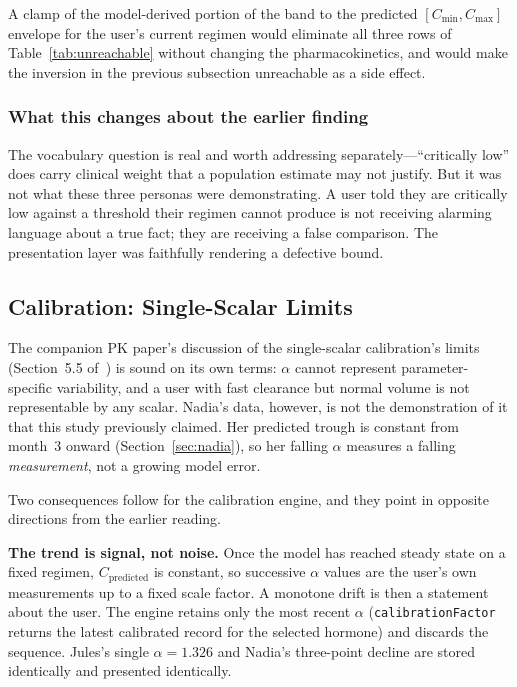 \documentclass[11pt,a4paper]{article}
\newcommand{\code}[1]{\texttt{\small #1}}
\begin{document}
A clamp of the model-derived portion of the band to the predicted
$[C_{\min}, C_{\max}]$ envelope for the user's current regimen would
eliminate all three rows of Table~\ref{tab:unreachable} without changing the
pharmacokinetics, and would make the inversion in the previous subsection
unreachable as a side effect.

\subsubsection{What this changes about the earlier finding}

The vocabulary question is real and worth addressing separately---``critically
low'' does carry clinical weight that a population estimate may not
justify. But it was not what these three personas were demonstrating. A user
told they are critically low against a threshold their regimen cannot
produce is not receiving alarming language about a true fact; they are
receiving a false comparison. The presentation layer was faithfully
rendering a defective bound.

\subsection{Calibration: Single-Scalar Limits}

The companion PK paper's discussion of the single-scalar calibration's
limits (Section~5.5 of~\cite{xtpk}) is sound on its own terms: $\alpha$
cannot represent parameter-specific variability, and a user with fast
clearance but normal volume is not representable by any scalar. Nadia's
data, however, is not the demonstration of it that this study previously
claimed. Her predicted trough is constant from month~3 onward
(Section~\ref{sec:nadia}), so her falling $\alpha$ measures a falling
\emph{measurement}, not a growing model error.

Two consequences follow for the calibration engine, and they point in
opposite directions from the earlier reading.

\textbf{The trend is signal, not noise.} Once the model has reached steady
state on a fixed regimen, $C_{\text{predicted}}$ is constant, so successive
$\alpha$ values are the user's own measurements up to a fixed scale factor.
A monotone drift is then a statement about the user. The engine retains only
the most recent $\alpha$ (\code{calibrationFactor} returns the latest
calibrated record for the selected hormone) and discards the sequence.
Jules's single $\alpha = 1.326$ and Nadia's three-point decline are stored
identically and presented identically.
\end{document}
